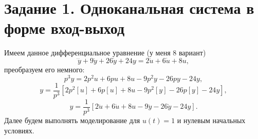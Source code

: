 \section*{Задание 1. Одноканальная система в форме вход-выход}

Имеем данное дифференциальное уравнение (у меня 8 вариант)
\begin{equation*}
    \dddot y + 9\ddot y + 26\dot y + 24 y = 2\ddot u +6\dot u +8 u,
\end{equation*}
преобразуем его немного:
\begin{equation*}
    p^3y=2p^2u+6pu+8u-9p^2y-26py-24y,
\end{equation*}
\begin{equation*}
    y=\frac{1}{p^3}[2p^2[u]+6p[u]+8u-9p^2[y]-26p[y]-24y],
\end{equation*}
\begin{equation*}
    y=\frac{1}{p^3}[2\ddot u+6\dot u+8u-9\ddot y-26\dot y-24y].
\end{equation*}
Далее будем выполнять моделирование для $u(t)=1$ и нулевым начальных условиях.



